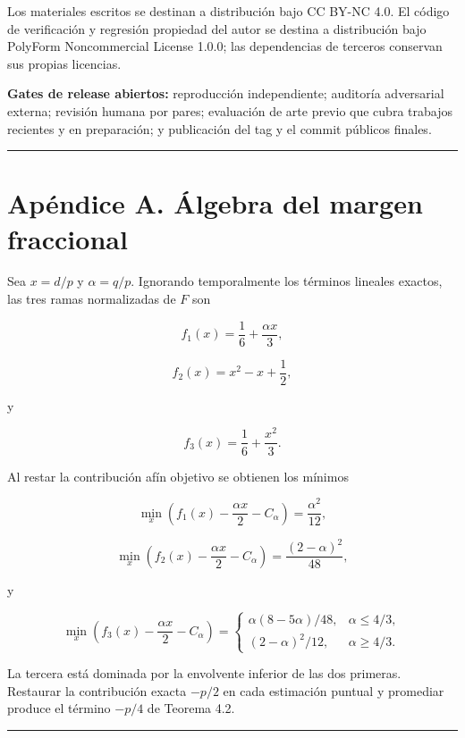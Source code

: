 \documentclass[
  spanish,
  11pt,
  a4paper,
]{article}
\begin{document}
Los materiales escritos se destinan a distribución bajo CC BY-NC 4.0. El código de verificación y regresión propiedad del autor se destina a distribución bajo PolyForm Noncommercial License 1.0.0; las dependencias de terceros conservan sus propias licencias.

\textbf{Gates de release abiertos:} reproducción independiente; auditoría adversarial externa; revisión humana por pares; evaluación de arte previo que cubra trabajos recientes y en preparación; y publicación del tag y el commit públicos finales.

\begin{center}\rule{0.5\linewidth}{0.5pt}\end{center}

\section{Apéndice A. Álgebra del margen fraccional}\label{apuxe9ndice-a.-uxe1lgebra-del-margen-fraccional}

Sea \(x=d/p\) y \(\alpha=q/p\). Ignorando temporalmente los términos lineales exactos, las tres ramas normalizadas de \(F\) son

\[
f_1(x)=\frac16+\frac{\alpha x}{3},
\]

\[
f_2(x)=x^2-x+\frac12,
\]

y

\[
f_3(x)=\frac16+\frac{x^2}{3}.
\]

Al restar la contribución afín objetivo se obtienen los mínimos

\[
\min_x\left(f_1(x)-\frac{\alpha x}{2}-C_\alpha\right)
=
\frac{\alpha^2}{12},
\]

\[
\min_x\left(f_2(x)-\frac{\alpha x}{2}-C_\alpha\right)
=
\frac{(2-\alpha)^2}{48},
\]

y

\[
\min_x\left(f_3(x)-\frac{\alpha x}{2}-C_\alpha\right)
=
\begin{cases}
\alpha(8-5\alpha)/48,&\alpha\le4/3,\\
(2-\alpha)^2/12,&\alpha\ge4/3.
\end{cases}
\]

La tercera está dominada por la envolvente inferior de las dos primeras. Restaurar la contribución exacta \(-p/2\) en cada estimación puntual y promediar produce el término \(-p/4\) de Teorema 4.2.

\begin{center}\rule{0.5\linewidth}{0.5pt}\end{center}
\end{document}
